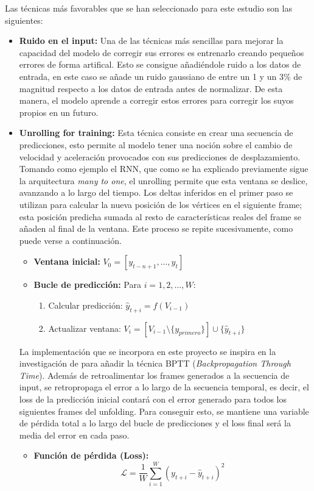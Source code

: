 Las técnicas más favorables que se han seleccionado para este estudio son las siguientes:
\begin{itemize}
    \item \textbf{Ruido en el input:} Una de las técnicas más sencillas para mejorar la capacidad del modelo de corregir sus errores es entrenarlo creando pequeños errores de forma artifical. Esto se consigue añadiéndole ruido a los datos de entrada, en este caso se añade un ruido gaussiano de entre un 1 y un 3\% de magnitud respecto a los datos de entrada antes de normalizar. De esta manera, el modelo aprende a corregir estos errores para corregir los suyos propios en un futuro.
    
    \item \textbf{Unrolling for training:} Esta técnica consiste en crear una secuencia de predicciones, esto permite al modelo tener una noción sobre el cambio de velocidad y aceleración provocados con sus predicciones de desplazamiento. Tomando como ejemplo el RNN, que como se ha explicado previamente sigue la arquitectura \textit{many to one}, el unrolling permite que esta ventana se deslice, avanzando a lo largo del tiempo. Los deltas inferidos en el primer paso se utilizan para calcular la nueva posición de los vértices en el siguiente frame; esta posición predicha sumada al resto de características reales del frame se añaden al final de la ventana. Este proceso se repite sucesivamente, como puede verse a continuación.
    \begin{itemize}
        \item \textbf{Ventana inicial:} $V_0 = [y_{t-n+1}, \dots, y_t]$
        \item \textbf{Bucle de predicción:} Para $i = 1, 2, \dots, W$:
        \begin{enumerate}
            \item Calcular predicción: $\hat{y}_{t+i} = f(V_{i-1})$
            \item Actualizar ventana: $V_i = [V_{i-1} \setminus \{y_{primero}\}] \cup \{\hat{y}_{t+i}\}$
        \end{enumerate}
    \end{itemize}
    
    La implementación que se incorpora en este proyecto se inspira en la investigación de \cite{holden_subspace_2019} para añadir la técnica BPTT (\textit{Backpropagation Through Time}). Además de retroalimentar los frames generados a la secuencia de input, se retropropaga el error a lo largo de la secuencia temporal, es decir, el loss de la predicción inicial contará con el error generado para todos los siguientes frames del unfolding. Para conseguir esto, se mantiene una variable de pérdida total a lo largo del bucle de predicciones y el loss final será la media del error en cada paso.
    \begin{itemize}
        \item \textbf{Función de pérdida (Loss):} 
        $$\mathcal{L} = \frac{1}{W} \sum_{i=1}^{W} (y_{t+i} - \hat{y}_{t+i})^2$$
    \end{itemize}
\end{itemize}

